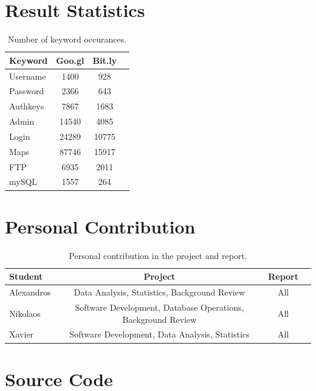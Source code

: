 \documentclass[12pt]{article}
\begin{document}
\begin{appendices}

\section{Result Statistics}

\begin{table}[h]
		\begin{tabular}{|l|c|c|c|}
			\hline
	  		\textbf{Keyword} & \textbf{Goo.gl} & \textbf{Bit.ly} \\
	  		\hline
  			Username & 1400 & 928 \\ 
  			\hline
  			Password & 2366 & 643 \\
	  		\hline
  			Authkeys & 7867 & 1683 \\
  			\hline
  			Admin & 14540 & 4085 \\
  			\hline
  			Login & 24289 & 10775 \\
  			\hline
  			Maps & 87746 & 15917 \\
  			\hline
  			FTP & 6935 & 2011 \\
  			\hline
  			mySQL & 1557 & 264 \\
  			\hline
   		\end{tabular}
	\caption[A table]{Number of keyword occurances.}
\end{table}
\newpage
\section{Personal Contribution} 

\begin{table}[hc]
		\begin{tabular}{|l|c|c|c|}
  			\hline
	  		\textbf{Student} & \textbf{Project} & \textbf{Report} \\
	  		\hline
  			Alexandros & Data Analysis, Statistics, Background Review & All \\ 
  			\hline
  			Nikolaos & Software Development, Database Operations, Background Review & All \\
	  		\hline
  			Xavier & Software Development, Data Analysis, Statistics & All \\
  			\hline
  		\end{tabular}
	\caption[A table]{Personal contribution in the project and report.}	
\end{table}

\newpage
\section{Source Code} 

\end{appendices}
\end{document}
